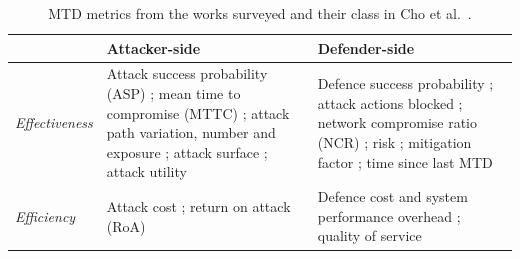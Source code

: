 \documentclass{cshonours}
\newcommand{\tablestyle}{\footnotesize\renewcommand{\arraystretch}{1.0}\rowcolors{2}{}{black!5}}
\begin{document}
\begin{table}[tbp]
  \caption[MTD metrics from the works surveyed]{MTD metrics from the works surveyed and their class in
  Cho et al.~\citep{cho2020}.}
  \label{tab:mtd-metrics}
  \tablestyle
  \begin{tabular}{@{}lP{6.4cm}P{6.4cm}@{}}
    \toprule
    & Attacker-side & Defender-side \\
    \midrule
    \emph{Effectiveness}
      & Attack success probability (ASP) \citep{evans2011, cho2020, kim2026, masud2025}; mean time to compromise (MTTC) \citep{mcqueen2006, cho2020, zhang2023, ho2024}; attack path variation, number and exposure \citep{hong2018}; attack surface \citep{manadhatawing2011tse}; attack utility \citep{cho2020}
      & Defence success probability \citep{cho2020}; attack actions blocked \citep{brown2023}; network compromise ratio (NCR) \citep{zhang2023}; risk \citep{alavizadeh2022, ho2024}; mitigation factor \citep{alavizadeh2022}; time since last MTD \citep{ho2024, tay2024} \\
    \addlinespace
    \emph{Efficiency}
      & Attack cost \citep{cho2020, alavizadeh2022}; return on attack (RoA) \citep{cremonini2005, alavizadeh2022}
      & Defence cost and system performance overhead \citep{cho2020, mendonca2023}; quality of service \citep{cho2020, mendonca2023} \\
    \bottomrule
  \end{tabular}
\end{table}

\end{document}
